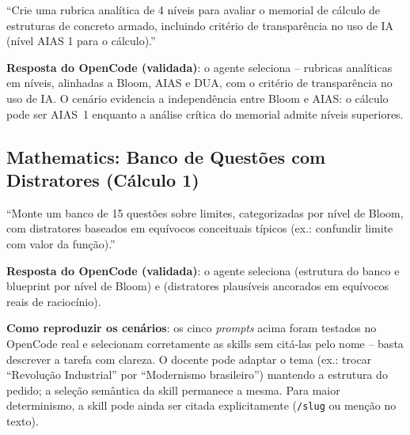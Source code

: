\begin{tcolorbox}[colback=white, colframe=boxborder, arc=1mm, title={Prompt Validado -- Engineering}]
\small
``Crie uma rubrica anal{\'i}tica de 4 n{\'i}veis para avaliar o memorial de c{\'a}lculo de estruturas de concreto armado, incluindo crit{\'e}rio de transpar{\^e}ncia no uso de IA (n{\'i}vel AIAS 1 para o c{\'a}lculo).''
\end{tcolorbox}

\textbf{Resposta do OpenCode (validada)}: o agente seleciona  -- rubricas anal{\'i}ticas em n{\'i}veis, alinhadas a Bloom, AIAS e DUA, com o crit{\'e}rio de transpar{\^e}ncia no uso de IA. O cen{\'a}rio evidencia a independ{\^e}ncia entre Bloom e AIAS: o c{\'a}lculo pode ser AIAS~1 enquanto a an{\'a}lise cr{\'i}tica do memorial admite n{\'i}veis superiores.

\subsection{Mathematics: Banco de Quest{\~o}es com Distratores (C{\'a}lculo 1)}

\begin{tcolorbox}[colback=white, colframe=boxborder, arc=1mm, title={Prompt Validado -- Mathematics}]
\small
``Monte um banco de 15 quest{\~o}es sobre limites, categorizadas por n{\'i}vel de Bloom, com distratores baseados em equ{\'i}vocos conceituais t{\'i}picos (ex.: confundir limite com valor da fun{\c c}{\~a}o).''
\end{tcolorbox}

\textbf{Resposta do OpenCode (validada)}: o agente seleciona  (estrutura do banco e blueprint por n{\'i}vel de Bloom) e  (distratores plaus{\'i}veis ancorados em equ{\'i}vocos reais de racioc{\'i}nio).

\begin{atencaopedagogica}
\textbf{Como reproduzir os cen{\'a}rios}: os cinco \emph{prompts} acima foram testados no OpenCode real e selecionam corretamente as skills sem cit{\'a}-las pelo nome -- basta descrever a tarefa com clareza. O docente pode adaptar o tema (ex.: trocar ``Revolu{\c c}{\~a}o Industrial'' por ``Modernismo brasileiro'') mantendo a estrutura do pedido; a sele{\c c}{\~a}o sem{\^a}ntica da skill permanece a mesma. Para maior determinismo, a skill pode ainda ser citada explicitamente (\texttt{/slug} ou men{\c c}{\~a}o no texto).
\end{atencaopedagogica}

